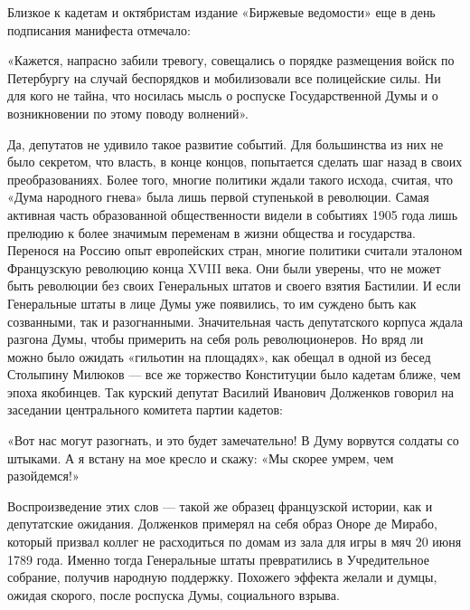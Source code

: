 Близкое к кадетам и октябристам издание «Биржевые ведомости» еще в день подписания манифеста отмечало:
\begin{textcitation}
«Кажется, напрасно забили тревогу, совещались о порядке размещения войск по Петербургу на случай беспорядков и мобилизовали все полицейские силы. Ни для кого не тайна, что носилась мысль о роспуске Государственной Думы и о возникновении по этому поводу волнений».
\end{textcitation}
Да, депутатов не удивило такое развитие событий. Для большинства из них не было секретом, что власть, в конце концов, попытается сделать шаг назад в своих преобразованиях. Более того, многие политики ждали такого исхода, считая, что «Дума народного гнева» была лишь первой ступенькой в революции.
Самая активная часть образованной общественности видели в событиях 1905 года лишь прелюдию к более значимым переменам в жизни общества и государства. Перенося на Россию опыт европейских стран, многие политики считали эталоном Французскую революцию конца XVIII века. Они были уверены, что не может быть революции без своих Генеральных штатов и своего взятия Бастилии. И если Генеральные штаты в лице Думы уже появились, то им суждено быть как созванными, так и разогнанными. Значительная часть депутатского корпуса ждала разгона Думы, чтобы примерить на себя роль революционеров. Но вряд ли можно было ожидать «гильотин на площадях», как обещал в одной из бесед Столыпину Милюков — все же торжество Конституции было кадетам ближе, чем эпоха якобинцев.
Так курский депутат Василий Иванович Долженков говорил на заседании центрального комитета партии кадетов:
\begin{textcitation}
«Вот нас могут разогнать, и это будет замечательно! В Думу ворвутся солдаты со штыками. А я встану на мое кресло и скажу: «Мы скорее умрем, чем разойдемся!»
\end{textcitation}
Воспроизведение этих слов — такой же образец французской истории, как и депутатские ожидания. Долженков примерял на себя образ Оноре де Мирабо, который призвал коллег не расходиться по домам из зала для игры в мяч 20 июня 1789 года. Именно тогда Генеральные штаты превратились в Учредительное собрание, получив народную поддержку. Похожего эффекта желали и думцы, ожидая скорого, после роспуска Думы, социального взрыва.

